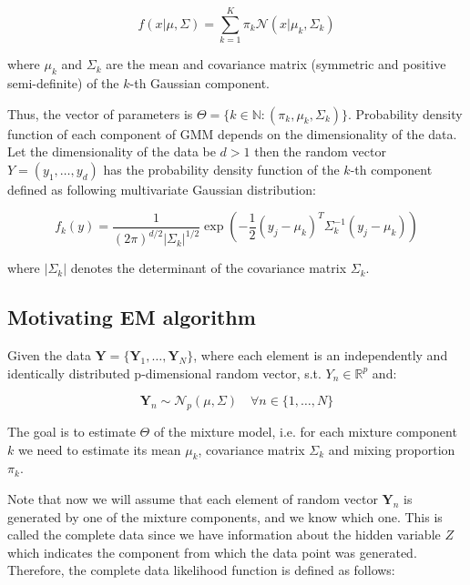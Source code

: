 \begin{equation}
    f(x|\mu,\Sigma) = \sum_{k=1}^{K} \pi_k \mathcal{N}(x|\mu_k, \Sigma_k)
\end{equation}

where $\mu_k$ and $\Sigma_k$ are the mean and covariance matrix (symmetric and positive semi-definite) of the $k$-th Gaussian component. 

Thus, the vector of parameters is $\Theta = \{k \in \mathbb{N}: (\pi_k,\mu_k,\Sigma_k)\}$. Probability density function of each component of GMM depends on the dimensionality of the data.
Let the dimensionality of the data be $d>1$ then the random vector $Y=(y_1,\ldots,y_d)$ has the probability density function of the $k$-th component 
defined as following multivariate Gaussian distribution:

\begin{equation}
    f_k(y) = \frac{1}{(2\pi)^{d/2}|\Sigma_k|^{1/2}} \exp\left(-\frac{1}{2}(y_j-\mu_k)^T\Sigma_k^{-1}(y_j-\mu_k)\right)
\end{equation}

where $|\Sigma_k|$ denotes the determinant of the covariance matrix $\Sigma_k$.

\subsection{Motivating EM algorithm}

Given the data $\textbf{Y} = \{\textbf{Y}_1,\ldots,\textbf{Y}_N\}$, where each element is an independently and identically distributed 
p-dimensional random vector, s.t. $Y_n \in \mathbb{R}^p$ and:

\begin{equation}
    \textbf{Y}_n \sim \mathcal{N}_p(\mu, \Sigma) \quad \forall n \in \{1,\ldots,N\} 
\end{equation}

The goal is to estimate $\Theta$ of the mixture model, 
i.e. for each mixture component $k$ we need to estimate its mean $\mu_k$, covariance matrix $\Sigma_k$ and mixing proportion $\pi_k$. 

Note that now we will assume that each element of random vector $\textbf{Y}_n$ is generated by one of the mixture components, and we know which one. 
This is called the complete data since we have information about the hidden variable $Z$ which indicates the component from which the data point was generated.
Therefore, the complete data likelihood function is defined as follows: 

